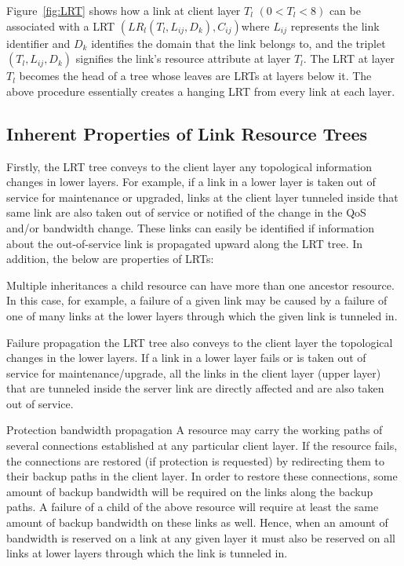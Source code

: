 Figure~\ref{fig:LRT} shows how a link at client layer $T_l$ $(0<T_l<8)$ can be associated with a LRT  $(LR_l(T_l, L_{ij}, D_k), C_{ij})$where $L_{ij}$ represents the link identifier and $D_k$ identifies the domain that the link belongs to, and the triplet $(T_l, L_{ij}, D_k)$ signifies the link's resource attribute at layer $T_l$. The LRT at layer $T_l$ becomes the head of a tree whose leaves are LRTs at layers below it. The above procedure essentially creates a hanging LRT from every link at each layer.

\subsection{Inherent Properties of Link Resource Trees}
Firstly, the LRT tree conveys to the client layer any topological information changes in lower layers. For example, if a link in a lower layer is taken out of service for maintenance or upgraded, links at the client layer tunneled inside that same link are also taken out of service or notified of the change in the QoS and/or bandwidth change. These links can easily be identified if information about the out-of-service link is propagated upward along the LRT tree. In addition, the below are properties of LRTs:

\begin{definition}{Multiple inheritances} a child resource can have more than one ancestor resource. In this case, for example, a failure of a given link may be caused by a failure of one of many links at the lower layers through which the given link is tunneled in.
\end{definition}

\begin{definition}{Failure propagation} the \gls{LRT} tree also conveys to the client layer the topological changes in the lower layers. If a link in a lower layer fails or is taken out of service for maintenance/upgrade, all the links in the client layer (upper layer) that are tunneled inside the server link are directly affected and are also taken out of service.
\end{definition}

\begin{definition}{Protection bandwidth propagation} A resource may carry the working paths of several connections established at any particular client layer. If the resource fails, the connections are restored (if protection is requested) by redirecting them to their backup paths in the client layer. In order to restore these connections, some amount of backup bandwidth will be required on the links along the backup paths. A failure of a child of the above resource will require at least the same amount of backup bandwidth on these links as well. Hence, when an amount of bandwidth is reserved on a link at any given layer it must also be reserved on all links at lower layers through which the link is tunneled in.
\end{definition}


